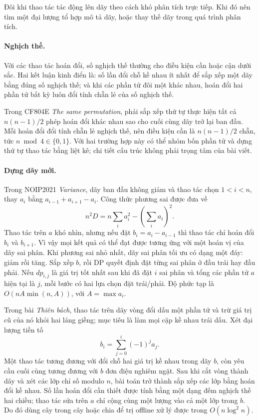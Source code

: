 \documentclass[11pt]{article}
\begin{document}
Đôi khi thao tác tác động lên dãy theo cách khó phân tích trực tiếp. Khi đó
nên tìm một đại lượng tổ hợp mô tả dãy, hoặc thay thế dãy trong quá trình phân
tích.

\paragraph{Nghịch thế.}
Với các thao tác hoán đổi, số nghịch thế thường cho điều kiện cần hoặc cận dưới
sắc. Hai kết luận kinh điển là: số lần đổi chỗ kề nhau ít nhất để sắp xếp một
dãy bằng đúng số nghịch thế; và khi các phần tử đôi một khác nhau, hoán đổi hai
phần tử bất kỳ luôn đổi tính chẵn lẻ của số nghịch thế.

Trong CF804E \emph{The same permutation}, phải sắp xếp thứ tự thực hiện tất cả
\(n(n-1)/2\) phép hoán đổi khác nhau sao cho cuối cùng dãy trở lại ban đầu. Mỗi
hoán đổi đổi tính chẵn lẻ nghịch thế, nên điều kiện cần là
\(n(n-1)/2\) chẵn, tức \(n\bmod 4\in\{0,1\}\). Với hai trường hợp này có thể
nhóm bốn phần tử và dựng thứ tự thao tác bằng liệt kê; chi tiết cấu trúc không
phải trọng tâm của bài viết.

\paragraph{Dựng dãy mới.}
Trong NOIP2021 \emph{Variance}, dãy ban đầu không giảm và thao tác chọn
\(1<i<n\), thay \(a_i\) bằng \(a_{i-1}+a_{i+1}-a_i\). Công thức phương sai được
đưa về
\[
  n^2D=n\sum_i a_i^2-\left(\sum_i a_i\right)^2.
\]
Thao tác trên \(a\) khó nhìn, nhưng nếu đặt \(b_i=a_i-a_{i-1}\) thì thao tác
chỉ hoán đổi \(b_i\) và \(b_{i+1}\). Vì vậy mọi kết quả có thể đạt được tương
ứng với một hoán vị của dãy sai phân. Khi phương sai nhỏ nhất, dãy sai phân tối
ưu có dạng một đáy: giảm rồi tăng. Sắp xếp \(b\), rồi DP quyết định đặt từng
sai phân ở đầu trái hay đầu phải. Nếu \(dp_{i,j}\) là giá trị tốt nhất sau khi
đã đặt \(i\) sai phân và tổng các phần tử \(a\) hiện tại là \(j\), mỗi bước có
hai lựa chọn đặt trái/phải. Độ phức tạp là \(O(nA\min(n,A))\), với
\(A=\max a_i\).

Trong bài \emph{Thiên bách}, thao tác trên dãy vòng đổi dấu một phần tử và trừ
giá trị cũ của nó khỏi hai láng giềng; mục tiêu là làm mọi cặp kề nhau trái
dấu. Xét đại lượng tiền tố
\[
  b_i=\sum_{j=0}^i (-1)^j a_j.
\]
Một thao tác tương đương với đổi chỗ hai giá trị kề nhau trong dãy \(b\), còn
yêu cầu cuối cùng tương đương với \(b\) đơn điệu nghiêm ngặt. Sau khi cắt vòng
thành dây và xét các lớp chỉ số modulo \(n\), bài toán trở thành sắp xếp các
lớp bằng hoán đổi kề nhau. Số lần hoán đổi cần thiết được tính bằng một dạng
đếm nghịch thế hai chiều; thao tác sửa trên \(a\) chỉ cộng cùng một lượng vào
cả một lớp trong \(b\). Do đó dùng cây trong cây hoặc chia để trị offline xử lý
được trong \(O(n\log^2 n)\).
\end{document}

